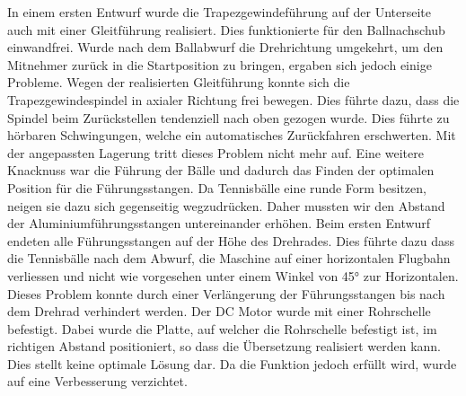In einem ersten Entwurf wurde die Trapezgewindeführung auf der Unterseite auch mit einer Gleitführung realisiert. Dies funktionierte für den Ballnachschub einwandfrei. Wurde nach dem Ballabwurf die Drehrichtung umgekehrt, um den Mitnehmer zurück in die Startposition zu bringen, ergaben sich jedoch einige Probleme. Wegen der realisierten Gleitführung konnte sich die Trapezgewindespindel in axialer Richtung frei bewegen. Dies führte dazu, dass die Spindel beim Zurückstellen tendenziell nach oben gezogen wurde. Dies führte zu hörbaren Schwingungen, welche ein automatisches Zurückfahren erschwerten. Mit der angepassten Lagerung tritt dieses Problem nicht mehr auf. 
Eine weitere Knacknuss war die Führung der Bälle und dadurch das Finden der optimalen Position für die Führungsstangen. Da Tennisbälle eine runde Form besitzen, neigen sie dazu sich gegenseitig wegzudrücken. Daher mussten wir den Abstand der Aluminiumführungsstangen untereinander erhöhen. Beim ersten Entwurf endeten alle Führungsstangen auf der Höhe des Drehrades. Dies führte dazu dass die Tennisbälle nach dem Abwurf, die Maschine auf einer horizontalen Flugbahn verliessen und nicht wie vorgesehen unter einem Winkel von 45° zur Horizontalen. Dieses Problem konnte durch einer Verlängerung der Führungsstangen bis nach dem Drehrad verhindert werden. 
Der DC Motor wurde mit einer Rohrschelle befestigt. Dabei wurde die Platte, auf welcher die Rohrschelle befestigt ist, im richtigen Abstand positioniert, so dass die Übersetzung realisiert werden kann. Dies stellt keine optimale Lösung dar. Da die Funktion jedoch erfüllt wird, wurde auf eine Verbesserung verzichtet. 
